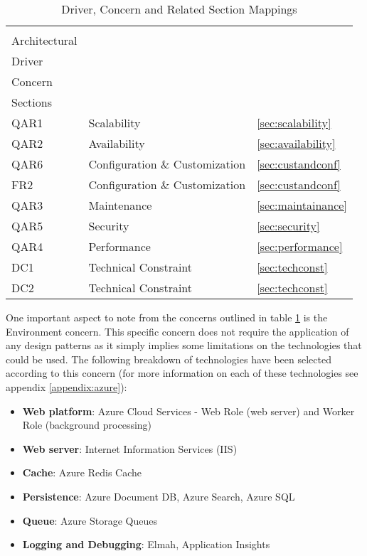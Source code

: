 \begin{table}[h]
\centering
\begin{tabularx}{\linewidth}{lXl}
\rowcolor[HTML]{EFEFEF} 
\begin{tabular}[c]{@{}l@{}}Candidate\\ Architectural\\ Driver\end{tabular} & \begin{tabular}[c]{@{}l@{}}Design\\ Concern\end{tabular} & \begin{tabular}[c]{@{}l@{}}Related\\ Sections\end{tabular} \\
QAR1 & Scalability & \ref{sec:scalability} \\
QAR2 & Availability & \ref{sec:availability} \\
QAR6 & Configuration \& Customization & \ref{sec:custandconf} \\
FR2 & Configuration \& Customization & \ref{sec:custandconf} \\
QAR3 & Maintenance & \ref{sec:maintainance} \\
QAR5 & Security & \ref{sec:security} \\
QAR4 & Performance & \ref{sec:performance} \\
DC1 & Technical Constraint & \ref{sec:techconst} \\
DC2 & Technical Constraint & \ref{sec:techconst} \\
\end{tabularx}
\caption{Driver, Concern and Related Section Mappings}
\label{table:designconcerns}
\end{table}

One important aspect to note from the concerns outlined in table \ref{table:designconcerns} is the Environment concern. This specific concern does not require the application of any design patterns as it simply implies some limitations on the technologies that could be used. The following breakdown of technologies have been selected according to this concern (for more information on each of these technologies see appendix \ref{appendix:azure}):
\begin{itemize}
\item \textbf{Web platform}: Azure Cloud Services - Web Role (web server) and Worker Role (background processing)
\item \textbf{Web server}: Internet Information Services (IIS)
\item \textbf{Cache}: Azure Redis Cache
\item \textbf{Persistence}: Azure Document DB, Azure Search, Azure SQL 
\item \textbf{Queue}: Azure Storage Queues
\item \textbf{Logging and Debugging}: Elmah, Application Insights
\end{itemize}

